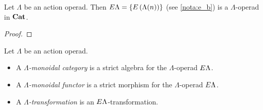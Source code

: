 %

\begin{cor}\label{cor:elambda_lambdaop}
Let $\Lambda$ be an action operad. Then $E\Lambda = \{ E\left(\Lambda(n)\right) \}$ (see \cref{nota:e_b}) is a $\Lambda$-operad in $\mathbf{Cat}$.
\end{cor}
\begin{proof}
\end{proof}



\begin{Defi}\label{Defi:lmc}
Let $\Lambda$ be an action operad.
\begin{itemize}
\item A \emph{$\Lambda$-monoidal category} is a strict algebra for the $\Lambda$-operad $E\Lambda$. 
\item A \emph{$\Lambda$-monoidal functor} is a strict morphism for the $\Lambda$-operad $E\Lambda$. 
\item A \emph{$\Lambda$-transformation} is an $E\Lambda$-transformation.
\end{itemize}
\end{Defi}

